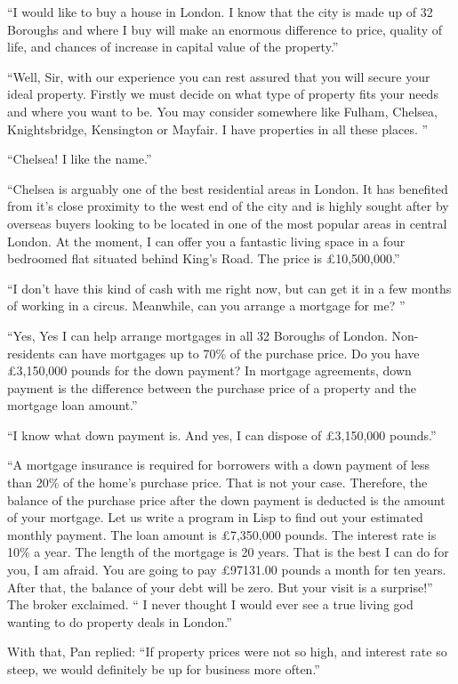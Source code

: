 \documentclass[a4paper,12pt]{book}
\begin{document}
“I would like to buy a house in London.
I know that the city is made up of 32 Boroughs
and where I buy will make an enormous difference
to price, quality of life, and chances of increase
in capital value of the property.”

“Well, Sir, with our experience you can rest
assured that you will secure your ideal property.
Firstly we must decide on what type of property
fits your needs and where you want to be. You
may consider somewhere like Fulham, Chelsea,
Knightsbridge, Kensington or Mayfair.
I have properties in all these places. ”

“Chelsea! I like the name.”

“Chelsea is arguably one of the best residential
areas in London. It has benefited from it’s close
proximity to the west end of the city and is highly
sought after by overseas buyers looking to be located
in one of the most popular areas in central London.
At the moment, I can offer you a fantastic living
space in a four bedroomed flat situated behind
King's Road. The price is £10,500,000.”

“I don't have this kind of cash with me right now,
but can get it in a few months of working in a
circus. Meanwhile, can you arrange a mortgage for me? ”

“Yes, Yes I can help arrange mortgages in all 32 Boroughs
of London. Non-residents can have mortgages up to 70\% of
the purchase price. Do you have £3,150,000 pounds for the
down payment? In mortgage agreements, down payment is
the difference between the purchase price of a property
and the mortgage loan amount.”

“I know what down payment is. And yes, I can dispose
of £3,150,000 pounds.”

“A mortgage insurance is required for borrowers with
a down payment of less than 20\% of the home's purchase
price. That is not your case. Therefore, the balance of
the purchase price after the down payment is deducted
is the amount of your mortgage. Let us write a program
in Lisp to find out your estimated monthly payment.
The loan amount is £7,350,000 pounds. The interest rate
is 10\% a year. The length of the mortgage is 20 years.
That is the best I can do for you, I am afraid.
You are going to pay £97131.00 pounds a month for
ten years. After that, the balance of your debt
will be zero. But your visit is a surprise!”
The broker exclaimed. “ I never thought I would
ever see a true living god wanting to do property
deals in London.”

With that, Pan replied: “If property prices
were not so high, and interest rate so steep,
we would definitely be up for business more often.”
\end{document}

